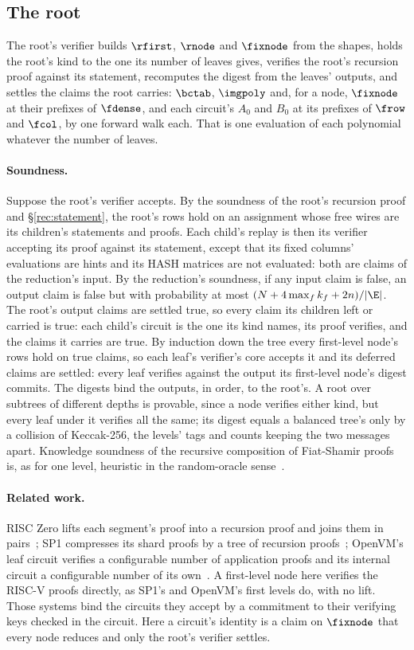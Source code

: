 \subsection{The root}\label{rec:root}

The root's verifier builds $\rfirst$, $\rnode$ and $\fixnode$ from the shapes, holds the root's kind to the one its number of leaves gives, verifies the root's recursion proof against its statement, recomputes the digest from the leaves' outputs, and settles the claims the root carries: $\bctab$, $\imgpoly$ and, for a node, $\fixnode$ at their prefixes of $\fdense$, and each circuit's $A_0$ and $B_0$ at its prefixes of $\frow$ and $\fcol$, by one forward walk each. That is one evaluation of each polynomial whatever the number of leaves.

\paragraph{Soundness.} Suppose the root's verifier accepts. By the soundness of the root's recursion proof and \S\ref{rec:statement}, the root's rows hold on an assignment whose free wires are its children's statements and proofs. Each child's replay is then its verifier accepting its proof against its statement, except that its fixed columns' evaluations are hints and its \textsf{HASH} matrices are not evaluated: both are claims of the reduction's input. By the reduction's soundness, if any input claim is false, an output claim is false but with probability at most $(N+4\max_fk_f+2n)/|\E|$. The root's output claims are settled true, so every claim its children left or carried is true: each child's circuit is the one its kind names, its proof verifies, and the claims it carries are true. By induction down the tree every first-level node's rows hold on true claims, so each leaf's verifier's core accepts it and its deferred claims are settled: every leaf verifies against the output its first-level node's digest commits. The digests bind the outputs, in order, to the root's. A root over subtrees of different depths is provable, since a node verifies either kind, but every leaf under it verifies all the same; its digest equals a balanced tree's only by a collision of Keccak-256, the levels' tags and counts keeping the two messages apart. Knowledge soundness of the recursive composition of Fiat-Shamir proofs is, as for one level, heuristic in the random-oracle sense~\cite{BCCT13}.

\paragraph{Related work.} RISC Zero lifts each segment's proof into a recursion proof and joins them in pairs~\cite{BG23}; SP1 compresses its shard proofs by a tree of recursion proofs~\cite{SP1}; OpenVM's leaf circuit verifies a configurable number of application proofs and its internal circuit a configurable number of its own~\cite{OpenVM}. A first-level node here verifies the RISC-V proofs directly, as SP1's and OpenVM's first levels do, with no lift. Those systems bind the circuits they accept by a commitment to their verifying keys checked in the circuit. Here a circuit's identity is a claim on $\fixnode$ that every node reduces and only the root's verifier settles.
